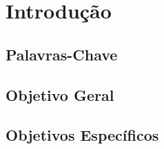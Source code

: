\chapter{Introdução}

\section{Palavras-Chave}

\section{Objetivo Geral}

\section{Objetivos Específicos}
